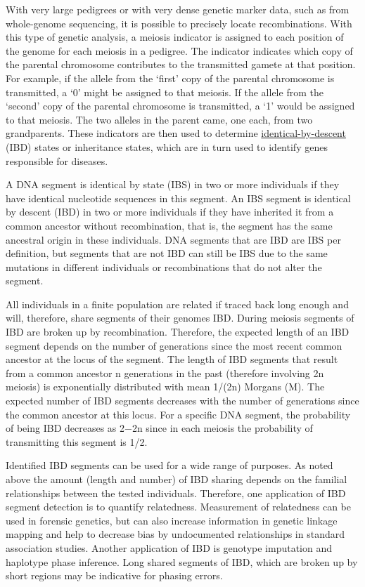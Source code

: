 With very large pedigrees or with very dense genetic marker data, such as from whole-genome sequencing, it is possible to precisely locate recombinations. With this type of genetic analysis, a meiosis indicator is assigned to each position of the genome for each meiosis in a pedigree. The indicator indicates which copy of the parental chromosome contributes to the transmitted gamete at that position. For example, if the allele from the `first' copy of the parental chromosome is transmitted, a `0' might be assigned to that meiosis. If the allele from the `second' copy of the parental chromosome is transmitted, a `1' would be assigned to that meiosis. The two alleles in the parent came, one each, from two grandparents. These indicators are then used to determine \href{https://en.wikipedia.org/wiki/Identity_by_descent}{identical-by-descent} (IBD) states or inheritance states, which are in turn used to identify genes responsible for diseases.

A DNA segment is identical by state (IBS) in two or more individuals if they have identical nucleotide sequences in this segment. An IBS segment is identical by descent (IBD) in two or more individuals if they have inherited it from a common ancestor without recombination, that is, the segment has the same ancestral origin in these individuals. DNA segments that are IBD are IBS per definition, but segments that are not IBD can still be IBS due to the same mutations in different individuals or recombinations that do not alter the segment.

All individuals in a finite population are related if traced back long enough and will, therefore, share segments of their genomes IBD. During meiosis segments of IBD are broken up by recombination. Therefore, the expected length of an IBD segment depends on the number of generations since the most recent common ancestor at the locus of the segment. The length of IBD segments that result from a common ancestor n generations in the past (therefore involving 2n meiosis) is exponentially distributed with mean 1/(2n) Morgans (M). The expected number of IBD segments decreases with the number of generations since the common ancestor at this locus. For a specific DNA segment, the probability of being IBD decreases as 2−2n since in each meiosis the probability of transmitting this segment is 1/2.

Identified IBD segments can be used for a wide range of purposes. As noted above the amount (length and number) of IBD sharing depends on the familial relationships between the tested individuals. Therefore, one application of IBD segment detection is to quantify relatedness. Measurement of relatedness can be used in forensic genetics, but can also increase information in genetic linkage mapping and help to decrease bias by undocumented relationships in standard association studies. Another application of IBD is genotype imputation and haplotype phase inference. Long shared segments of IBD, which are broken up by short regions may be indicative for phasing errors.


